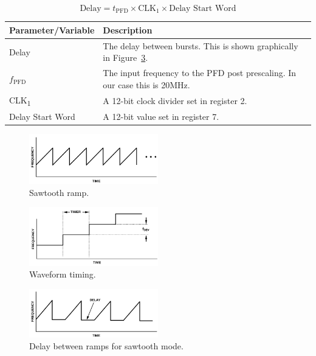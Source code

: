 \begin{equation}
        \label{eq:adf4158-delay}
        \text{Delay} = t_{\text{PFD}} \times \text{CLK}_1 \times \text{Delay Start Word}
\end{equation}

\label{tab:adf4158-delay-equation-vars}
\begin{tabularx}{\textwidth}{l X>{\raggedright\arraybackslash}X}
        \toprule
        \textbf{Parameter/Variable} & \textbf{Description} \\
        \midrule

        Delay & The delay between bursts. This is shown graphically in Figure~\ref{fig:adf4158-delay}. \\
        $f_{\text{PFD}}$ & The input frequency to the PFD post prescaling. In our case this is 20MHz. \\
        CLK\textsubscript{1} & A 12-bit clock divider set in register 2. \\
        Delay Start Word & A 12-bit value set in register 7. \\

        \bottomrule
\end{tabularx}

\begin{figure}[h]
        \centering
        \includegraphics[width=0.5\textwidth]{data/adf4158-sawtooth-ramp.png}
        \caption{Sawtooth ramp.}
        \label{fig:adf4158-sawtooth-ramp}\end{figure}

\begin{figure}[h]
        \centering
        \includegraphics[width=0.5\textwidth]{data/adf4158-waveform-timing.png}
        \caption{Waveform timing.}
        \label{fig:adf4158-waveform-timing}
\end{figure}

\begin{figure}[h]
        \centering
        \includegraphics[width=0.5\textwidth]{data/adf4158-delay.png}
        \caption{Delay between ramps for sawtooth mode.}
        \label{fig:adf4158-delay}
\end{figure}

